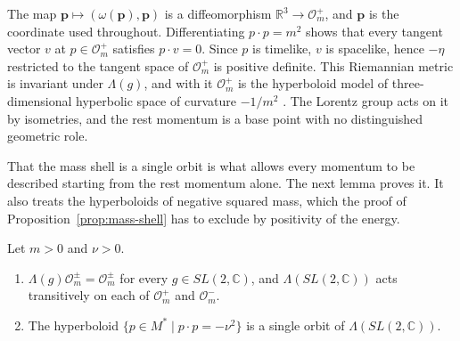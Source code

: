 \begin{remark}
	The map $\mathbf{p}\mapsto(\omega(\mathbf{p}),\mathbf{p})$ is a diffeomorphism $\mathbb{R}^3\to\mathcal{O}_m^+$, and $\mathbf{p}$ is the coordinate used throughout. Differentiating $p\cdot p=m^2$ shows that every tangent vector $v$ at $p\in\mathcal{O}_m^+$ satisfies $p\cdot v=0$. Since $p$ is timelike, $v$ is spacelike, hence $-\eta$ restricted to the tangent space of $\mathcal{O}_m^+$ is positive definite. This Riemannian metric is invariant under $\Lambda(g)$, and with it $\mathcal{O}_m^+$ is the hyperboloid model of three-dimensional hyperbolic space of curvature $-1/m^2$ \cite[TODO-location]{TODO-Ratcliffe}. The Lorentz group acts on it by isometries, and the rest momentum is a base point with no distinguished geometric role.
\end{remark}

That the mass shell is a single orbit is what allows every momentum to be described starting from the rest momentum alone. The next lemma proves it. It also treats the hyperboloids of negative squared mass, which the proof of Proposition~\ref{prop:mass-shell} has to exclude by positivity of the energy.

\begin{lemma}\label{lem:hyperboloid-orbits}
	Let $m>0$ and $\nu>0$.
	\begin{enumerate}
		\item $\Lambda(g)\mathcal{O}_m^{\pm}=\mathcal{O}_m^{\pm}$ for every $g\in SL(2,\mathbb{C})$, and $\Lambda(SL(2,\mathbb{C}))$ acts transitively on each of $\mathcal{O}_m^+$ and $\mathcal{O}_m^-$.
		\item The hyperboloid $\{p\in M^*\mid p\cdot p=-\nu^2\}$ is a single orbit of $\Lambda(SL(2,\mathbb{C}))$.
	\end{enumerate}
\end{lemma}

